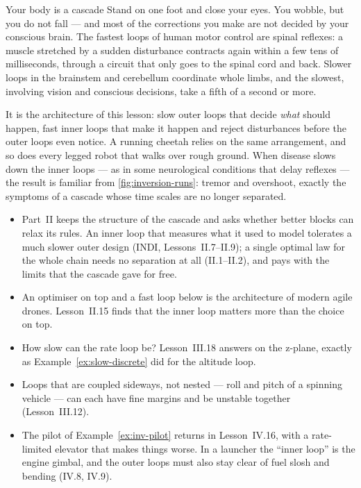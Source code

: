 \begin{curiosity}{Your body is a cascade}
Stand on one foot and close your eyes. You wobble, but you do not fall — and most of the corrections you make are not decided by your conscious brain. The fastest loops of human motor control are spinal reflexes: a muscle stretched by a sudden disturbance contracts again within a few tens of milliseconds, through a circuit that only goes to the spinal cord and back. Slower loops in the brainstem and cerebellum coordinate whole limbs, and the slowest, involving vision and conscious decisions, take a fifth of a second or more.

It is the architecture of this lesson: slow outer loops that decide \emph{what} should happen, fast inner loops that make it happen and reject disturbances before the outer loops even notice. A running cheetah relies on the same arrangement, and so does every legged robot that walks over rough ground. When disease slows down the inner loops — as in some neurological conditions that delay reflexes — the result is familiar from \cref{fig:inversion-runs}: tremor and overshoot, exactly the symptoms of a cascade whose time scales are no longer separated.
\end{curiosity}

\begin{lookahead}
\begin{itemize}[leftmargin=1.2em]
  \item Part~II keeps the structure of the cascade and asks whether better blocks can relax its rules. An inner loop that measures what it used to model tolerates a much slower outer design (INDI, Lessons~II.7–II.9); a single optimal law for the whole chain needs no separation at all (II.1–II.2), and pays with the limits that the cascade gave for free.
  \item An optimiser on top and a fast loop below is the architecture of modern agile drones. Lesson~II.15 finds that the inner loop matters more than the choice on top.
  \item How slow can the rate loop be? Lesson~III.18 answers on the z-plane, exactly as Example~\ref{ex:slow-discrete} did for the altitude loop.
  \item Loops that are coupled sideways, not nested — roll and pitch of a spinning vehicle — can each have fine margins and be unstable together (Lesson~III.12).
  \item The pilot of Example~\ref{ex:inv-pilot} returns in Lesson~IV.16, with a rate-limited elevator that makes things worse. In a launcher the \enquote{inner loop} is the engine gimbal, and the outer loops must also stay clear of fuel slosh and bending (IV.8, IV.9).
\end{itemize}
\end{lookahead}

